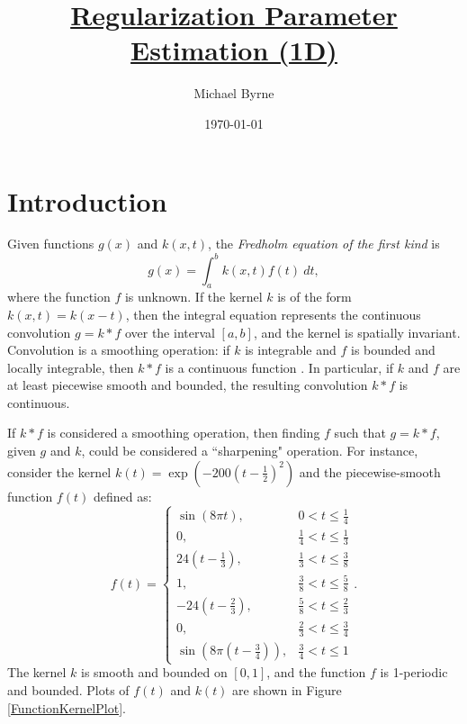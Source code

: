 \documentclass[12pt]{article}
\title{\underline{Regularization Parameter Estimation (1D)}}
\author{Michael Byrne}
\date{\today}
\begin{document}
\maketitle

\section{Introduction} \label{sec:Introduction}
Given functions $g(x)$ and $k(x,t)$, the \textit{Fredholm equation of the first kind} is
\begin{equation}
	g(x) = \int_a^b k(x,t)f(t)\:dt,
	\label{eq:Con}
\end{equation}
where the function $f$ is unknown. If the kernel $k$ is of the form $k(x,t) = k(x-t)$, then the integral equation represents the continuous convolution $g = k * f$ over the interval $[a,b]$, and the kernel is spatially invariant. Convolution is a smoothing operation: if $k$ is integrable and $f$ is bounded and locally integrable, then $k * f$ is a continuous function \cite{DebnathLokenath1999ItHs}. In particular, if $k$ and $f$ are at least piecewise smooth and bounded, the resulting convolution $k * f$ is continuous. \par
If $k * f$ is considered a smoothing operation, then finding $f$ such that $g = k * f$, given $g$ and $k$, could be considered a ``sharpening" operation. For instance, consider the kernel $k(t) = \exp(-200(t-\frac{1}{2})^2)$ and the piecewise-smooth function $f(t)$ defined as:
\begin{equation}
f(t) = \begin{cases}
\sin\left(8\pi{t}\right), & 0 < t \leq \frac{1}{4} \\
0, & \frac{1}{4} < t \leq \frac{1}{3} \\
24\left(t-\frac{1}{3}\right), & \frac{1}{3} < t \leq \frac{3}{8} \\
1, & \frac{3}{8} < t \leq \frac{5}{8} \\
-24\left(t-\frac{2}{3}\right), & \frac{5}{8} < t \leq \frac{2}{3} \\
0, & \frac{2}{3} < t \leq \frac{3}{4} \\
\sin\left(8\pi\left(t-\frac{3}{4}\right)\right), & \frac{3}{4} < t \leq 1
\end{cases}.
\label{eq:Test Function 2}
\end{equation}
The kernel $k$ is smooth and bounded on $[0,1]$, and the function $f$ is 1-periodic and bounded. Plots of $f(t)$ and $k(t)$ are shown in Figure \ref{FunctionKernelPlot}. \par
\end{document}
